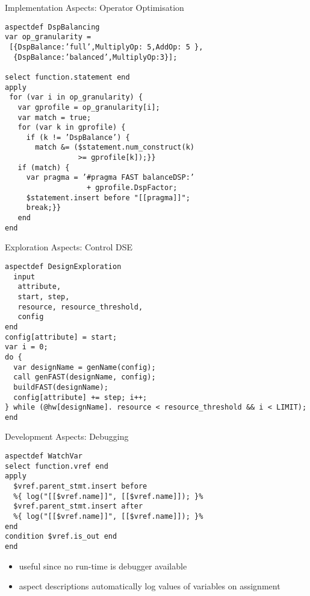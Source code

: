\begin{frame}[fragile]{Implementation Aspects: Operator Optimisation}
\begin{lstlisting}[label=lst:label, style=lara]
aspectdef DspBalancing
var op_granularity =
 [{DspBalance:’full’,MultiplyOp: 5,AddOp: 5 },
  {DspBalance:’balanced’,MultiplyOp:3}];

select function.statement end
apply
 for (var i in op_granularity) {
   var gprofile = op_granularity[i];
   var match = true;
   for (var k in gprofile) {
     if (k != ’DspBalance’) {
       match &= ($statement.num_construct(k)
                 >= gprofile[k]);}}
   if (match) {
     var pragma = ’#pragma FAST balanceDSP:’
                   + gprofile.DspFactor;
     $statement.insert before "[[pragma]]";
     break;}}
   end
end
\end{lstlisting}
\end{frame}

\begin{frame}[fragile]{Exploration Aspects: Control DSE}
\begin{lstlisting}[label=lst:label, style=lara]
aspectdef DesignExploration
  input
   attribute,
   start, step,
   resource, resource_threshold,
   config
end
config[attribute] = start;
var i = 0;
do {
  var designName = genName(config);
  call genFAST(designName, config);
  buildFAST(designName);
  config[attribute] += step; i++;
} while (@hw[designName]. resource < resource_threshold && i < LIMIT);
end
\end{lstlisting}
\end{frame}

\begin{frame}[fragile]{Development Aspects: Debugging}
\begin{lstlisting}[label=lst:label, style=lara]
aspectdef WatchVar
select function.vref end
apply
  $vref.parent_stmt.insert before
  %{ log("[[$vref.name]]", [[$vref.name]]); }%
  $vref.parent_stmt.insert after
  %{ log("[[$vref.name]]", [[$vref.name]]); }%
end
condition $vref.is_out end
end
\end{lstlisting}

\begin{itemize}
\item useful since no run-time is debugger available
\item aspect descriptions automatically log values of variables on assignment
\end{itemize}
\end{frame}
